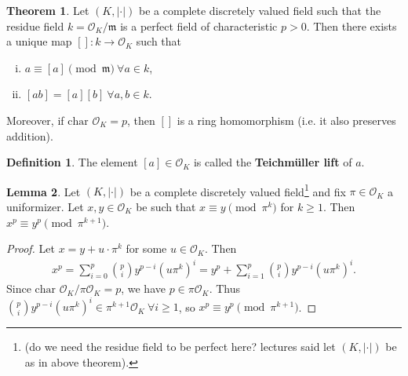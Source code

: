 \documentclass{article}
\theoremstyle{definition}
\newtheorem{theorem}{Theorem}[section]
\newtheorem{lemma}[theorem]{Lemma}
\newtheorem{defn}{Definition}[section]
\begin{document}
\begin{theorem}
    Let $(K,|\cdot|)$ be a complete discretely valued field such that the residue field $k = \mathcal{O}_K/\mathfrak{m}$ is a perfect field of characteristic $p>0$. Then there exists a unique map $[]: k \to \mathcal{O}_K$ such that 
    \begin{enumerate}[(i)]
        \item $a \equiv [a] \pmod{\mathfrak{m}} ~\forall a \in k$,
        \item $[ab] = [a][b] ~\forall a,b \in k$.
    \end{enumerate}
    Moreover, if $\text{char }\mathcal{O}_K = p$, then $[]$ is a ring homomorphism (i.e. it also preserves addition).
\end{theorem}
\begin{defn}
    The element $[a] \in \mathcal{O}_K$ is called the \textbf{Teichmüller lift} of $a$.
\end{defn}
\begin{lemma}
    Let $(K,|\cdot|)$ be a complete discretely valued field\footnote{(do we need the residue field to be perfect here? lectures said let $(K,|\cdot|)$ be as in above theorem).} and fix $\pi \in \mathcal{O}_K$ a uniformizer. Let $x,y \in \mathcal{O}_K$ be such that $x \equiv y \pmod{\pi^k}$ for $k\ge 1$. Then $x^p \equiv y^p \pmod{\pi^{k+1}}$. 
\end{lemma}
\begin{proof}
    Let $x = y + u\cdot \pi^k$ for some $u \in \mathcal{O}_K$. Then \begin{align*}
        x^p = \sum_{i=0}^{p} {p\choose i}y^{p-i}(u \pi^k)^{i} = y^p +\sum_{i=1}^{p} {p \choose i}y^{p-i}(u \pi^k)^{i}.
    \end{align*}
    Since $\text{char }\mathcal{O}_K/\pi \mathcal{O}_K = p$, we have $p \in \pi \mathcal{O}_K$. Thus ${p\choose i}y^{p-i}(u \pi^k)^i \in \pi^{k+1}\mathcal{O}_K ~\forall i\ge 1$, so $x^p \equiv y^p \pmod{\pi^{k+1}}$.
\end{proof}
\end{document}
